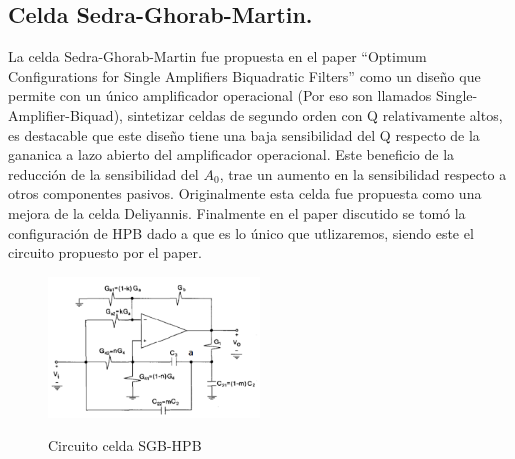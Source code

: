 \subsection{Celda Sedra-Ghorab-Martin.}
La celda Sedra-Ghorab-Martin fue propuesta en el paper ``Optimum Configurations for Single Amplifiers Biquadratic Filters'' como un diseño que permite con un único amplificador operacional (Por eso son llamados Single-Amplifier-Biquad), sintetizar celdas de segundo orden con Q relativamente altos, es destacable que este diseño tiene una baja sensibilidad del Q respecto de la gananica a lazo abierto del amplificador operacional. Este beneficio de la reducción de la sensibilidad del $A_0$, trae un aumento en la sensibilidad respecto a otros componentes pasivos. Originalmente esta celda fue propuesta como una mejora de la celda Deliyannis.
Finalmente en el paper discutido se tomó la configuración de HPB dado a que es lo único que utlizaremos, siendo este el circuito propuesto por el paper.
\begin{figure}[H]
	\centering
	\includegraphics[width=0.5\textwidth]{Imagenes-Ej3/HPBSedra.PNG}
	\label{fig:HPBSedra}
	\caption{Circuito celda SGB-HPB}
\end{figure}
